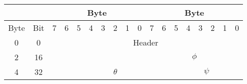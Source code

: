 \begin{table}[H]
\centering
\begin{tabular}{llclllllllllllllll}
\hline
\multicolumn{2}{|c|}{}& \multicolumn{8}{c|}{Byte}                                                                                                                                                                           & \multicolumn{8}{c|}{Byte}                                                                                                                                                                                 \\ \hline
\multicolumn{1}{|l|}{Byte} & \multicolumn{1}{l|}{Bit} & \multicolumn{1}{c|}{7} & \multicolumn{1}{c|}{6} & \multicolumn{1}{c|}{5} & \multicolumn{1}{c|}{4} & \multicolumn{1}{c|}{3} & \multicolumn{1}{c|}{2} & \multicolumn{1}{c|}{1} & \multicolumn{1}{c|}{0} & \multicolumn{1}{|c|}{7} & \multicolumn{1}{c|}{6} & \multicolumn{1}{c|}{5} & \multicolumn{1}{c|}{4} & \multicolumn{1}{c|}{3} & \multicolumn{1}{c|}{2} & \multicolumn{1}{c|}{1} & \multicolumn{1}{c|}{0} \\ \hline
\multicolumn{1}{|c|}{0}    & \multicolumn{1}{c|}{0}   & \multicolumn{16}{c|}{Header}                                                                                                                                                                                                                                                                                                                                                                                        \\ \hline
\multicolumn{1}{|c|}{2}    & \multicolumn{1}{c|}{16}  & \multicolumn{8}{c|}{}                                                                                                                                                                                 & \multicolumn{8}{c|}{$\phi$}                                                                                                                                                                                 \\ \hline
\multicolumn{1}{|c|}{4}    & \multicolumn{1}{c|}{32}  & \multicolumn{1}{c|}{}  & \multicolumn{9}{c|}{$\theta$}                                                                                                                                                                                                  & \multicolumn{6}{c|}{$\psi$}                                                                                                                               \\ \hline

\end{tabular}
\end{table}
